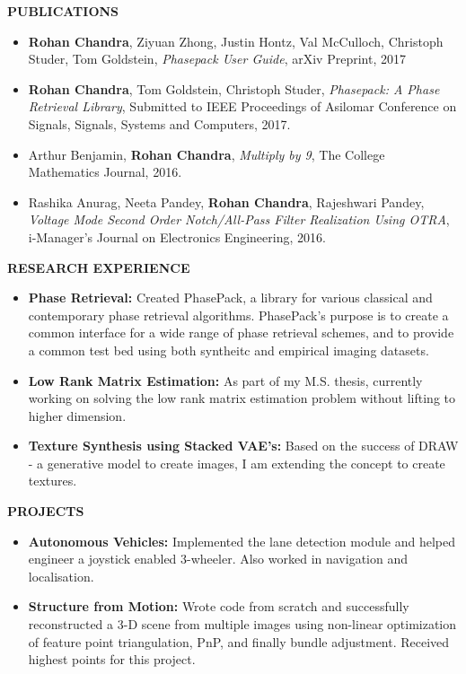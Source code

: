 \documentclass[a4paper,8pt]{article}
\newcommand{\resheading}[1]{\begin{tcolorbox} \begin{center} #1 \end{center} \end{tcolorbox}}
\begin{document}
\resheading{\textbf{PUBLICATIONS} }
\begin{itemize}[noitemsep]
\item \noindent \textbf{Rohan Chandra}, Ziyuan Zhong, Justin Hontz, Val McCulloch, Christoph Studer, Tom Goldstein, \textit{Phasepack User Guide}, arXiv Preprint, 2017
\item \noindent \textbf{Rohan Chandra}, Tom Goldstein, Christoph Studer, \textit{Phasepack: A Phase Retrieval Library}, Submitted to IEEE Proceedings of Asilomar Conference on Signals, Signals, Systems and Computers, 2017.
\item \noindent Arthur Benjamin, \textbf{Rohan Chandra}, \textit{Multiply by 9}, The College Mathematics Journal, 2016.
\item \noindent Rashika Anurag, Neeta Pandey, \textbf{Rohan Chandra}, Rajeshwari Pandey, \textit{Voltage Mode Second Order Notch/All-Pass Filter Realization Using OTRA}, i-Manager's Journal on Electronics Engineering, 2016.
\end{itemize}

\resheading{\textbf{RESEARCH EXPERIENCE} }
\begin{itemize}[noitemsep]
\item\textbf{Phase Retrieval:} Created PhasePack, a library for various classical and contemporary phase retrieval algorithms. PhasePack's purpose is to create a common interface for a wide range of phase retrieval schemes, and to provide a common test bed using both syntheitc and empirical imaging datasets.

\item \textbf{Low Rank Matrix Estimation:} As part of my M.S. thesis, currently working on solving the low rank matrix estimation problem without lifting to higher dimension.

\item \textbf{Texture Synthesis using Stacked VAE's:} Based on the success of DRAW - a generative model to create images, I am extending the concept to create textures.
\end{itemize}


\resheading{\textbf{PROJECTS} }
\begin{itemize}[noitemsep]
\item\textbf{Autonomous Vehicles:} Implemented the lane detection module and helped engineer a joystick enabled 3-wheeler. Also worked in navigation and localisation. 

\item \textbf{Structure from Motion:} Wrote code from scratch and successfully reconstructed a 3-D scene from multiple images using non-linear optimization of feature point triangulation, PnP, and finally bundle adjustment. Received highest points for this project.
\end{itemize}
\end{document}
